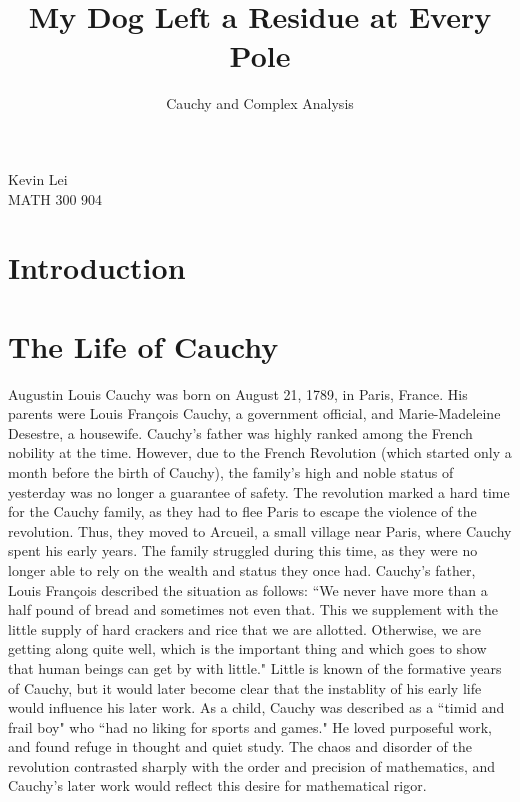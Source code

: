 \documentclass[12pt,letterpaper]{article}
\title{My Dog Left a Residue at Every Pole}
\author{Cauchy and Complex Analysis}
\date{}
\begin{document}
\begin{titlepage}
\maketitle
\thispagestyle{empty}
\begin{center}
    Kevin Lei \\
    MATH 300 904
\end{center}
\begin{abstract}

\end{abstract}
\end{titlepage}

\newpage
\thispagestyle{empty}
\tableofcontents

\newpage
\setcounter{page}{1}

\section{Introduction}

\section{The Life of Cauchy}
Augustin Louis Cauchy was born on August 21, 1789, in Paris, France.
His parents were Louis François Cauchy, a government official, and Marie-Madeleine Desestre, a housewife.
Cauchy's father was highly ranked among the French nobility at the time.
However, due to the French Revolution (which started only a month before the birth of Cauchy), the family's high and noble status of yesterday was no longer a guarantee of safety.
The revolution marked a hard time for the Cauchy family, as they had to flee Paris to escape the violence of the revolution.
Thus, they moved to Arcueil, a small village near Paris, where Cauchy spent his early years.
The family struggled during this time, as they were no longer able to rely on the wealth and status they once had.
Cauchy's father, Louis François described the situation as follows:
``We never have more than a half pound of bread and sometimes not
even that. This we supplement with the little supply of hard crackers and
rice that we are allotted. Otherwise, we are getting along quite well,
which is the important thing and which goes to show that human beings
can get by with little." \cite{Belhoste1991}
Little is known of the formative years of Cauchy, but it would later become clear that the instablity of his early life would influence his later work.
As a child, Cauchy was described as a ``timid and frail boy" who ``had no liking for sports and games." \cite{Belhoste1991}
He loved purposeful work, and found refuge in thought and quiet study.
The chaos and disorder of the revolution contrasted sharply with the order and precision of mathematics, and Cauchy's later work would reflect this desire for mathematical rigor.
\end{document}
